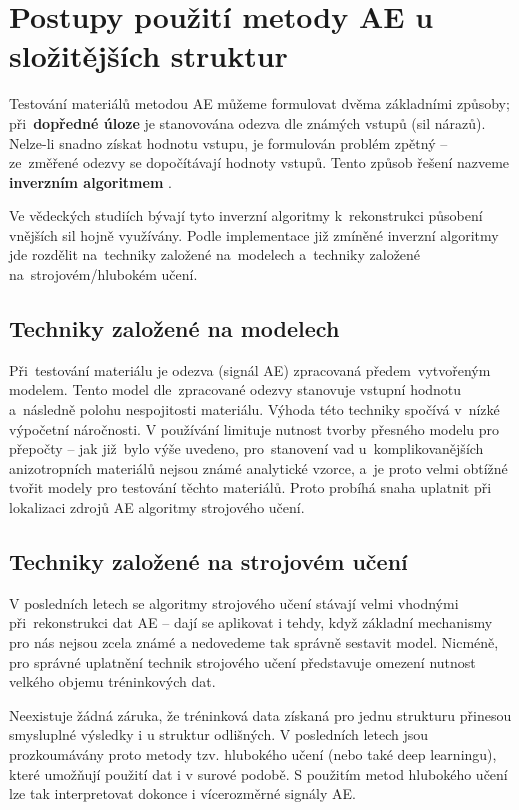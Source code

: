 \section{Postupy použití metody AE u složitějších struktur}%
Testování materiálů 
metodou AE můžeme formulovat 
dvěma základními způsoby; při~\textbf{dopředné úloze} je 
stanovována odezva dle známých vstupů (sil nárazů). 
Nelze-li snadno získat hodnotu vstupu, 
je formulován problém zpětný – ze~změřené odezvy se 
dopočítávají hodnoty vstupů. 
Tento způsob řešení nazveme \textbf{inverzním algoritmem} \cite{Benes_podklad_advances}.

Ve vědeckých studiích bývají tyto inverzní algoritmy k~rekonstrukci působení vnějších sil hojně využívány. Podle implementace již zmíněné inverzní algoritmy jde rozdělit na~techniky založené na~modelech a~techniky založené na~strojovém/hlubokém učení.
\subsection{Techniky založené na modelech}
Při~testování materiálu je odezva (signál AE) zpracovaná předem~vytvořeným modelem. Tento model dle~zpracované odezvy stanovuje vstupní hodnotu a~následně polohu nespojitosti materiálu. Výhoda této techniky spočívá v~nízké výpočetní náročnosti. V používání limituje nutnost tvorby přesného modelu pro přepočty – jak již~bylo výše uvedeno, pro~stanovení vad u~komplikovanějších anizotropních materiálů nejsou známé analytické vzorce, a~je proto velmi obtížné tvořit modely pro testování těchto materiálů. Proto probíhá snaha uplatnit při lokalizaci zdrojů \ac{AE} algoritmy strojového učení.
\subsection{Techniky založené na strojovém učení}
V posledních letech se algoritmy strojového učení stávají velmi vhodnými při~rekonstrukci dat AE – dají se aplikovat i tehdy, když základní mechanismy pro nás nejsou zcela známé a nedovedeme tak správně sestavit model. Nicméně, pro správné uplatnění technik strojového učení představuje omezení nutnost velkého objemu tréninkových dat. 

Neexistuje žádná záruka, že tréninková data získaná pro jednu strukturu přinesou smysluplné výsledky i u struktur odlišných. V posledních letech jsou prozkoumávány proto metody tzv. hlubokého učení (nebo také deep learningu), které umožňují použití dat i v surové podobě. S použitím metod hlubokého učení lze tak interpretovat dokonce i vícerozměrné signály \ac{AE}.

